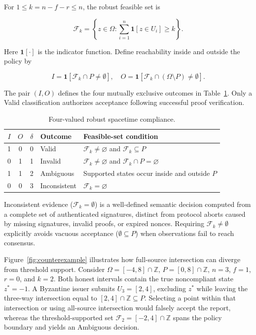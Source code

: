 \documentclass[pdflatex,iicol,sn-mathphys-num]{sn-jnl}
\theoremstyle{thmstyleone}
\begin{document}
For $1 \le k = n - f - r \le n$, the robust feasible set is

\begin{equation}\label{eq:feasible}
\mathcal{F}_k = \left\{ z \in \Omega : \sum_{i=1}^{n} \mathbf{1}[z \in U_i] \ge k \right\}.
\end{equation}


Here $\mathbf{1}[\cdot]$ is the indicator function. Define reachability inside and outside the policy by

\[I = \mathbf{1}[\mathcal{F}_k \cap P \neq \emptyset], \quad O = \mathbf{1}[\mathcal{F}_k \cap (\Omega \setminus P) \neq \emptyset].\]


The pair $(I, O)$ defines the four mutually exclusive outcomes in Table~\ref{tab:decisions}. Only a Valid classification authorizes acceptance following successful proof verification.



\begin{table}[t]\centering\small
\caption{Four-valued robust spacetime compliance.}\label{tab:decisions}
\begin{tabularx}{\linewidth}{@{}ccclX@{}}\toprule
$I$ & $O$ & $\delta$ & Outcome & Feasible-set condition\\\midrule
1&0&0&Valid&$\mathcal F_k\ne\varnothing$ and $\mathcal F_k\subseteq P$\\
0&1&1&Invalid&$\mathcal F_k\ne\varnothing$ and $\mathcal F_k\cap P=\varnothing$\\
1&1&2&Ambiguous&Supported states occur inside and outside $P$\\
0&0&3&Inconsistent&$\mathcal F_k=\varnothing$\\\bottomrule
\end{tabularx}
\end{table}

Inconsistent evidence ($\mathcal{F}_k = \emptyset$) is a well-defined semantic decision computed from a complete set of authenticated signatures, distinct from protocol aborts caused by missing signatures, invalid proofs, or expired nonces. Requiring $\mathcal{F}_k \neq \emptyset$ explicitly avoids vacuous acceptance ($\emptyset \subseteq P$) when observations fail to reach consensus.



Figure~\ref{fig:counterexample} illustrates how full-source intersection can diverge from threshold support. Consider $\Omega = [-4, 8] \cap \mathbb{Z}$, $P = [0, 8] \cap \mathbb{Z}$, $n = 3$, $f = 1$, $r = 0$, and $k = 2$. Both honest intervals contain the true noncompliant state $z^* = -1$. A Byzantine issuer submits $U_3 = [2, 4]$, excluding $z^*$ while leaving the three-way intersection equal to $[2, 4] \cap \mathbb{Z} \subseteq P$. Selecting a point within that intersection or using all-source intersection would falsely accept the report, whereas the threshold-supported set $\mathcal{F}_2 = [-2, 4] \cap \mathbb{Z}$ spans the policy boundary and yields an Ambiguous decision.
\end{document}
